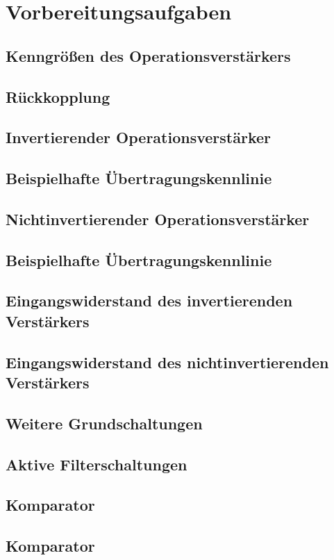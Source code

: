 \documentclass[a4paper, 12pt]{article}
\begin{document}
  
  \clearpage
  \setcounter{page}{1}

\section{Vorbereitungsaufgaben}

\subsection{Kenngrößen des Operationsverstärkers}


\subsection{Rückkopplung}


\subsection{Invertierender Operationsverstärker}


\subsection{Beispielhafte Übertragungskennlinie}


\subsection{Nichtinvertierender Operationsverstärker}


\subsection{Beispielhafte Übertragungskennlinie}


\subsection{Eingangswiderstand des invertierenden Verstärkers}


\subsection{Eingangswiderstand des nichtinvertierenden Verstärkers}


\subsection{Weitere Grundschaltungen}


\subsection{Aktive Filterschaltungen}


\subsection{Komparator}


\subsection{Komparator}

\end{document}
